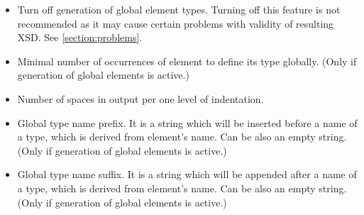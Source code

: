 \documentclass[a4paper,10pt,oneside]{article}
\begin{document}
\begin{itemize}
	\item Turn off generation of global element types. Turning off this feature is not recommended as it may cause certain problems with validity of resulting XSD. See \ref{section:problems}.
	\item Minimal number of occurrences of element to define its type globally. (Only if generation of global elements is active.)
	\item Number of spaces in output per one level of indentation.
	\item Global type name prefix. It is a string which will be inserted before a name of a type, which is derived from element's name. Can be also an empty string. (Only if generation of global elements is active.)
	\item Global type name suffix. It is a string which will be appended after a name of a type, which is derived from element's name. Can be also an empty string. (Only if generation of global elements is active.)
\end{itemize}


\nocite{*}
\newpage


\end{document}
